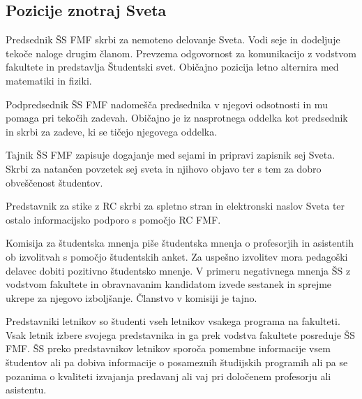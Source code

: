\documentclass[a4paper,oneside,12pt]{article}
\theoremstyle{definition}
\newenvironment{description*}{\vspace{-6pt}\begin{description}\setlength{\itemsep}{0pt}\setlength{\parskip}{2pt}}{\end{description}\vspace{-1\parskip}}
\begin{document}
\subsection*{Pozicije znotraj Sveta}
\begin{description*}
  \item[Predsednik ŠS FMF] skrbi za nemoteno delovanje Sveta. Vodi seje in dodeljuje tekoče naloge
    drugim članom. Prevzema odgovornost za komunikacijo z vodstvom fakultete in predstavlja
    Študentski svet. Običajno pozicija letno alternira med matematiki in fiziki.
  \item[Podpredsednik ŠS FMF] nadomešča predsednika v njegovi odsotnosti in mu pomaga pri tekočih
    zadevah. Običajno je iz nasprotnega oddelka kot predsednik in skrbi za zadeve, ki se tičejo
    njegovega oddelka.
  \item[Tajnik ŠS FMF] zapisuje dogajanje med sejami in pripravi zapisnik sej Sveta. Skrbi za
    natančen povzetek sej sveta in njihovo objavo ter s tem za dobro obveščenost študentov.
  \item[Predstavnik za stike z RC] skrbi za spletno stran in elektronski naslov Sveta ter ostalo
    informacijsko podporo s pomočjo RC FMF.
  \item[Komisija za študentska mnenja] piše študentska mnenja o profesorjih in asistentih ob
    izvolitvah s pomočjo študentskih anket. Za uspešno izvolitev mora pedagoški delavec dobiti
    pozitivno študentsko mnenje. V primeru negativnega mnenja ŠS z vodstvom fakultete in
    obravnavanim kandidatom izvede sestanek in sprejme ukrepe za njegovo izboljšanje. Članstvo v komisiji je tajno.
  \item[Predstavniki letnikov] so študenti vseh letnikov vsakega programa na fakulteti. Vsak letnik
    izbere svojega predstavnika in ga prek vodstva fakultete posreduje ŠS FMF. ŠS preko
    predstavnikov letnikov sporoča pomembne informacije vsem študentov ali pa dobiva informacije o
    posameznih študijskih programih ali pa se pozanima o kvaliteti izvajanja predavanj ali vaj pri
    določenem profesorju ali asistentu.
\end{description*}
\end{document}
